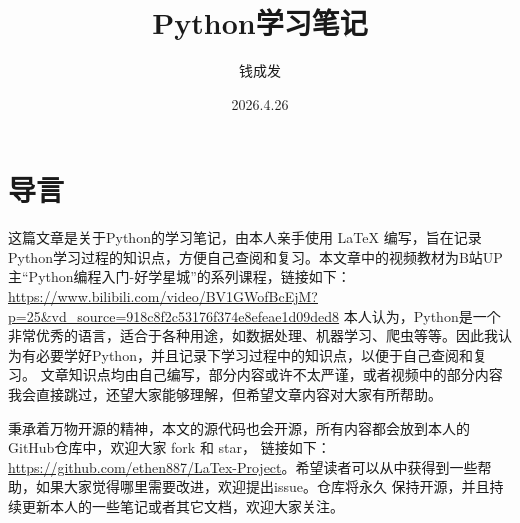 \documentclass{ctexart}
\title{Python学习笔记}
\author{钱成发}
\date{2026.4.26}
\begin{document}
\maketitle
\tableofcontents
\newpage

\section*{导言}
这篇文章是关于Python的学习笔记，由本人亲手使用 \LaTeX{} 编写，旨在记录Python学习过程的知识点，方便自己查阅和复习。本文章中的视频教材为B站UP主“Python编程入门-好学星城”的系列课程，链接如下：
\url{https://www.bilibili.com/video/BV1GWofBcEjM?p=25&vd_source=918c8f2c53176f374e8efeae1d09ded8}
本人认为，Python是一个非常优秀的语言，适合于各种用途，如数据处理、机器学习、爬虫等等。因此我认为有必要学好Python，并且记录下学习过程中的知识点，以便于自己查阅和复习。
文章知识点均由自己编写，部分内容或许不太严谨，或者视频中的部分内容我会直接跳过，还望大家能够理解，但希望文章内容对大家有所帮助。
\par
秉承着万物开源的精神，本文的源代码也会开源，所有内容都会放到本人的GitHub仓库中，欢迎大家 fork 和 star，
链接如下：
\url{https://github.com/ethen887/LaTex-Project}。希望读者可以从中获得到一些帮助，如果大家觉得哪里需要改进，欢迎提出issue。仓库将永久
保持开源，并且持续更新本人的一些笔记或者其它文档，欢迎大家关注。
\newpage









\end{document}
